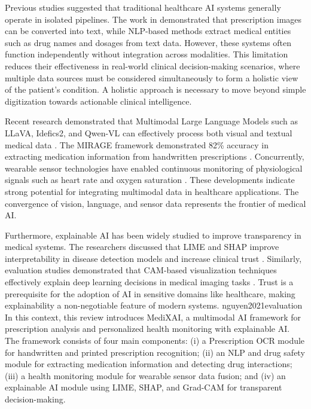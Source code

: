 \documentclass[conference]{IEEEtran}
\begin{document}
Previous studies suggested that traditional healthcare AI systems generally operate in isolated pipelines. The work in \cite{gudi2025enhancing} demonstrated that prescription images can be converted into text, while NLP-based methods extract medical entities such as drug names and dosages from text data. However, these systems often function independently without integration across modalities. This limitation reduces their effectiveness in real-world clinical decision-making scenarios, where multiple data sources must be considered simultaneously to form a holistic view of the patient's condition. A holistic approach is necessary to move beyond simple digitization towards actionable clinical intelligence.

Recent research demonstrated that Multimodal Large Language Models such as LLaVA, Idefics2, and Qwen-VL can effectively process both visual and textual medical data \cite{mankash2024mirage,intuitionlabs2026pharma}. The MIRAGE framework demonstrated 82\% accuracy in extracting medication information from handwritten prescriptions \cite{gifu2022aibacked,mankash2024mirag}. Concurrently, wearable sensor technologies have enabled continuous monitoring of physiological signals such as heart rate and oxygen saturation \cite{kin2024medical}. These developments indicate strong potential for integrating multimodal data in healthcare applications. The convergence of vision, language, and sensor data represents the frontier of medical AI.

Furthermore, explainable AI has been widely studied to improve transparency in medical systems. The researchers discussed that LIME and SHAP improve interpretability in disease detection models and increase clinical trust \cite{nguyen2021evaluation}. Similarly, evaluation studies demonstrated that CAM-based visualization techniques effectively explain deep learning decisions in medical imaging tasks \cite{kumar2025doctors,singaravelu2018prescription}. Trust is a prerequisite for the adoption of AI in sensitive domains like healthcare, making explainability a non-negotiable feature of modern systems.
nguyen2021evaluation
In this context, this review introduces MediXAI, a multimodal AI framework for prescription analysis and personalized health monitoring with explainable AI. The framework consists of four main components: (i) a Prescription OCR module for handwritten and printed prescription recognition; (ii) an NLP and drug safety module for extracting medication information and detecting drug interactions; (iii) a health monitoring module for wearable sensor data fusion; and (iv) an explainable AI module using LIME, SHAP, and Grad-CAM for transparent decision-making.
\end{document}
